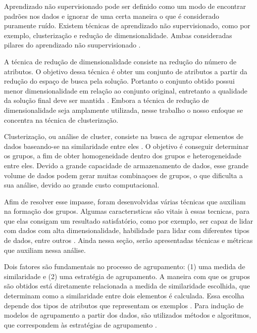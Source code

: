 Aprendizado não supervisionado pode ser definido como um modo de encontrar padrões nos dados e ignorar de uma certa maneira o que é considerado puramente ruído. Existem técnicas de aprendizado não supervisionado, como por exemplo, clusterização e redução de dimensionalidade. Ambas consideradas pilares do aprendizado não suupervisionado \cite{conf/ac/Ghahramani03}. 

A técnica de redução de dimensionalidade consiste na redução do número de atributos. O objetivo dessa técnica é obter um conjunto de atributos a partir da redução do espaço de busca pela solução. Portanto o conjunto obtido possui menor dimensionalidade em relação ao conjunto original, entretanto a qualidade da solução final deve ser mantida  \cite{oai:teses.usp.br:tde-06052009-154832}. Embora a técnica de redução de dimensionalidade seja amplamente utilizada, nesse trabalho o nosso enfoque se concentra na técnica de clusterização.

Clusterização, ou análise de cluster, consiste na busca de agrupar elementos de dados baseando-se na similaridade entre eles \cite{Doni:2004}. O objetivo é conseguir determinar os grupos, a fim de obter homogeneidade dentro dos grupos e heterogeneidade entre eles. Devido a grande capacidade de armazenamento de dados, esse grande volume de dados podem gerar muitas combinaçoes de grupos, o que dificulta a sua análise, devido ao grande custo computacional. 

Afim de resolver esse impasse, foram desenvolvidas várias técnicas que auxiliam na formação dos grupos. Algumas caracterısticas são vitais à essas tecnicas, para que
elas consigam um resultado satisfatório, como por exemplo, ser capaz de lidar com dados com alta dimensionalidade, habilidade para lidar com diferentes tipos de dados, entre
outros \cite{conf/pakdd/ZaianeFLW02}. Ainda nessa seção, serão apresentadas técnicas e métricas que auxiliam nessa análise.

Dois fatores são fundamentais no processo de agrupamento: (1) uma medida de similaridade e (2) uma estratégia de agrupamento. A maneira com que os grupos são obtidos está diretamente relacionada a medida de similaridade escolhida, que determinam como a similaridade entre dois elementos é calculada. Essa escolha depende dos tipos de atributos que representam os exemplos \cite{RicardoMarcondes:2014}. Para indução de modelos de agrupamento a partir dos dados, são utilizados métodos e algoritmos, que correspondem às estratégias de agrupamento \cite{hastie2009unsupervised}.


